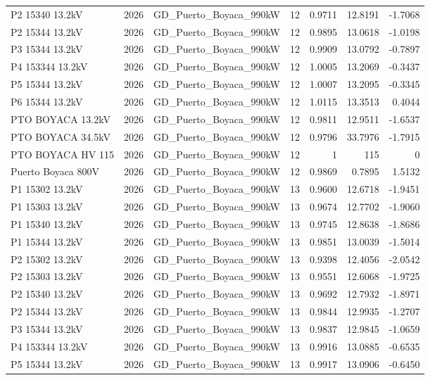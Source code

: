 \documentclass[11pt,a4paper]{article}
\begin{document}
\begin{longtable}{llllrrr}
P2 15340 13.2kV & 2026 & GD\_Puerto\_Boyaca\_990kW & 12 & 0.9711 & 12.8191 & -1.7068 \\
P2 15344 13.2kV & 2026 & GD\_Puerto\_Boyaca\_990kW & 12 & 0.9895 & 13.0618 & -1.0198 \\
P3 15344 13.2kV & 2026 & GD\_Puerto\_Boyaca\_990kW & 12 & 0.9909 & 13.0792 & -0.7897 \\
P4 153344 13.2kV & 2026 & GD\_Puerto\_Boyaca\_990kW & 12 & 1.0005 & 13.2069 & -0.3437 \\
P5 15344 13.2kV & 2026 & GD\_Puerto\_Boyaca\_990kW & 12 & 1.0007 & 13.2095 & -0.3345 \\
P6 15344 13.2kV & 2026 & GD\_Puerto\_Boyaca\_990kW & 12 & 1.0115 & 13.3513 & 0.4044 \\
PTO BOYACA 13.2kV & 2026 & GD\_Puerto\_Boyaca\_990kW & 12 & 0.9811 & 12.9511 & -1.6537 \\
PTO BOYACA 34.5kV & 2026 & GD\_Puerto\_Boyaca\_990kW & 12 & 0.9796 & 33.7976 & -1.7915 \\
PTO BOYACA HV 115 & 2026 & GD\_Puerto\_Boyaca\_990kW & 12 & 1 & 115 & 0 \\
Puerto Boyaca 800V & 2026 & GD\_Puerto\_Boyaca\_990kW & 12 & 0.9869 & 0.7895 & 1.5132 \\
P1 15302 13.2kV & 2026 & GD\_Puerto\_Boyaca\_990kW & 13 & 0.9600 & 12.6718 & -1.9451 \\
P1 15303 13.2kV & 2026 & GD\_Puerto\_Boyaca\_990kW & 13 & 0.9674 & 12.7702 & -1.9060 \\
P1 15340 13.2kV & 2026 & GD\_Puerto\_Boyaca\_990kW & 13 & 0.9745 & 12.8638 & -1.8686 \\
P1 15344 13.2kV & 2026 & GD\_Puerto\_Boyaca\_990kW & 13 & 0.9851 & 13.0039 & -1.5014 \\
P2 15302 13.2kV & 2026 & GD\_Puerto\_Boyaca\_990kW & 13 & 0.9398 & 12.4056 & -2.0542 \\
P2 15303 13.2kV & 2026 & GD\_Puerto\_Boyaca\_990kW & 13 & 0.9551 & 12.6068 & -1.9725 \\
P2 15340 13.2kV & 2026 & GD\_Puerto\_Boyaca\_990kW & 13 & 0.9692 & 12.7932 & -1.8971 \\
P2 15344 13.2kV & 2026 & GD\_Puerto\_Boyaca\_990kW & 13 & 0.9844 & 12.9935 & -1.2707 \\
P3 15344 13.2kV & 2026 & GD\_Puerto\_Boyaca\_990kW & 13 & 0.9837 & 12.9845 & -1.0659 \\
P4 153344 13.2kV & 2026 & GD\_Puerto\_Boyaca\_990kW & 13 & 0.9916 & 13.0885 & -0.6535 \\
P5 15344 13.2kV & 2026 & GD\_Puerto\_Boyaca\_990kW & 13 & 0.9917 & 13.0906 & -0.6450 \\

\end{longtable}
\end{document}
